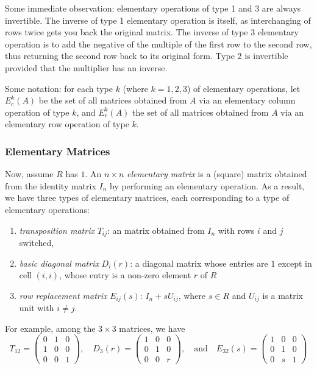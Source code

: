 \documentclass[12pt]{article}
\begin{document}
Some immediate observation: elementary operations of type 1 and 3 are always invertible.  The inverse of type 1 elementary operation is itself, as interchanging of rows twice gets you back the original matrix.  The inverse of type 3 elementary operation is to add the negative of the multiple of the first row to the second row, thus returning the second row back to its original form.  Type 2 is invertible provided that the multiplier has an inverse.

Some notation: for each type $k$ (where $k=1,2,3$) of elementary operations, let $E_c^k(A)$ be the set of all matrices obtained from $A$ via an elementary column operation of type $k$, and $E_r^k(A)$ the set of all matrices obtained from $A$ via an elementary row operation of type $k$.

\subsubsection*{Elementary Matrices}

Now, assume $R$ has $1$.  An $n\times n$ \emph{elementary matrix} is a (square) matrix obtained from the identity matrix $I_n$ by performing an elementary operation.  As a result, we have three types of elementary matrices, each corresponding to a type of elementary operations:
\begin{enumerate}
\item \emph{transposition matrix} $T_{ij}$: an matrix obtained from $I_n$ with rows $i$ and $j$ switched,
\item \emph{basic diagonal matrix} $D_i(r)$: a diagonal matrix whose entries are $1$ except in cell $(i,i)$, whose entry is a non-zero element $r$ of $R$
\item \emph{row replacement matrix} $E_{ij}(s)$: $I_n + s U_{ij}$, where $s\in R$ and $U_{ij}$ is a matrix unit with $i\ne j$.
\end{enumerate}

For example, among the $3\times 3$ matrices, we have 
$$T_{12} = \begin{pmatrix} 0 & 1 & 0 \\ 1 & 0 & 0 \\ 0 & 0 & 1 \end{pmatrix}, \quad
D_3(r) = \begin{pmatrix} 1 & 0 & 0 \\ 0 & 1 & 0 \\ 0 & 0 & r \end{pmatrix},\quad\mbox{and}\quad
E_{32}(s) = \begin{pmatrix} 1 & 0 & 0 \\ 0 & 1 & 0 \\ 0 & s & 1 \end{pmatrix}$$
\end{document}

